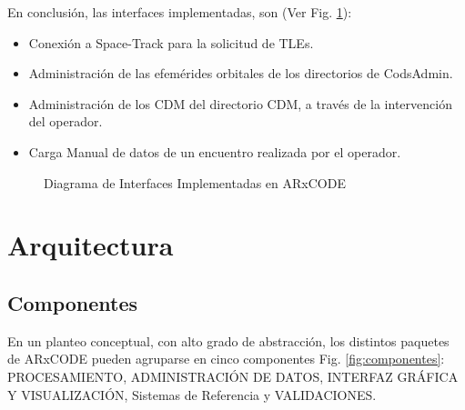 En conclusi\'on, las interfaces implementadas, son (Ver Fig. \ref{fig:interfacesImpl}):\\
\begin{itemize}
\itemsep0em
 \item Conexi\'on a Space-Track para la solicitud de TLEs.
 \item Administraci\'on de las efem\'erides orbitales de los directorios de CodsAdmin.
 \item Administraci\'on de los CDM del directorio CDM, a trav\'es de la intervenci\'on del operador.
 \item Carga Manual de datos de un encuentro realizada por el operador.
\end{itemize}

\begin{figure}
\centering
  \caption[Diagrama de Interfaces Implementadas en ARxCODE]{Diagrama de Interfaces Implementadas en ARxCODE}
  \label{fig:interfacesImpl}
\end{figure}

\section{Arquitectura}


\subsection*{Componentes}\label{subsec:componentes}
En un planteo conceptual, con alto grado de abstracci\'on, los distintos paquetes de ARxCODE pueden agruparse en cinco componentes Fig.  \ref{fig:componentes}: PROCESAMIENTO, ADMINISTRACI\'ON DE DATOS, INTERFAZ GR\'AFICA Y VISUALIZACI\'ON, Sistemas de Referencia y VALIDACIONES.\\

